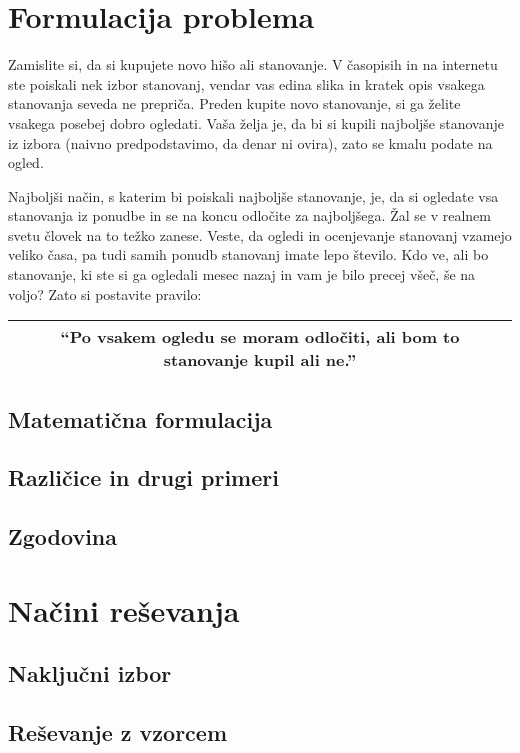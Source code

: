 \documentclass[a4paper, 12pt, titlepage]{article}
\begin{document}
\newpage
\section{Formulacija problema}

Zamislite si, da si kupujete novo hišo ali stanovanje. V časopisih in na internetu ste poiskali nek izbor stanovanj, vendar vas edina slika in kratek opis vsakega stanovanja seveda ne prepriča. Preden kupite novo stanovanje, si ga želite vsakega posebej dobro ogledati. Vaša želja je, da bi si kupili najboljše stanovanje iz izbora (naivno predpodstavimo, da denar ni ovira), zato se kmalu podate na ogled.

Najboljši način, s katerim bi poiskali najboljše stanovanje, je, da si ogledate vsa stanovanja iz ponudbe in se na koncu odločite za najboljšega. Žal se v realnem svetu človek na to težko zanese. Veste, da ogledi in ocenjevanje stanovanj vzamejo veliko časa, pa tudi samih ponudb stanovanj imate lepo število. Kdo ve, ali bo stanovanje, ki ste si ga ogledali mesec nazaj in vam je bilo precej všeč, še na voljo? Zato si postavite pravilo:

\begin{tabular}{|c|}
    \hline
\textbf{``Po vsakem ogledu se moram odločiti, ali bom to stanovanje kupil ali ne.''}\\
    \hline
\end{tabular}

\subsection{Matematična formulacija}
\subsection{Različice in drugi primeri}
\subsection{Zgodovina}

\section{Načini reševanja}
\subsection{Naključni izbor}
\subsection{Reševanje z vzorcem}
\end{document}
